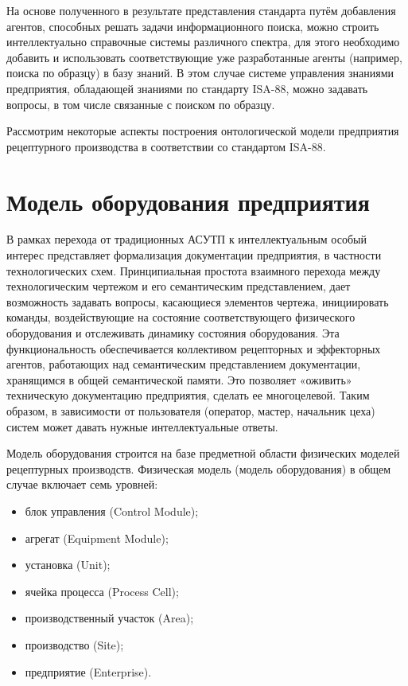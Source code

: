 На основе полученного в результате представления стандарта путём добавления агентов, способных решать задачи информационного поиска, можно строить интеллектуально справочные системы различного спектра, для этого необходимо добавить и использовать соответствующие уже разработанные агенты (например, поиска по образцу) в базу знаний. В этом случае системе управления знаниями предприятия, обладающей знаниями по стандарту ISA-88, можно задавать вопросы, в том числе связанные с поиском по образцу.

Рассмотрим некоторые аспекты построения онтологической модели предприятия рецептурного производства в соответствии со стандартом ISA-88.

\section{Модель оборудования предприятия}

В рамках перехода от традиционных АСУТП к интеллектуальным особый интерес представляет формализация документации предприятия, в частности технологических схем. Принципиальная простота взаимного перехода между технологическим чертежом и его семантическим представлением, дает возможность задавать вопросы, касающиеся элементов чертежа, инициировать команды, воздействующие на состояние соответствующего физического оборудования и отслеживать динамику состояния оборудования. Эта функциональность обеспечивается коллективом рецепторных и эффекторных агентов, работающих над семантическим представлением документации, хранящимся в общей семантической памяти. Это позволяет «оживить» техническую документацию предприятия, сделать ее многоцелевой. Таким образом, в зависимости от пользователя (оператор, мастер, начальник цеха) систем может давать нужные интеллектуальные ответы.

Модель оборудования строится на базе предметной области физических моделей рецептурных производств. Физическая модель (модель оборудования) в общем случае включает семь уровней:

\begin{itemize}
    \item блок управления (Control Module);
    \item агрегат (Equipment Module);
    \item установка (Unit);
    \item ячейка процесса (Process Cell);
    \item производственный участок (Area);
    \item производство (Site);
    \item предприятие (Enterprise).
\end{itemize}


